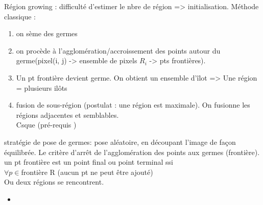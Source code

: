 \documentclass[11pt]{article}
\begin{document}
Région growing : difficulté d'estimer le nbre de région => initialisation. Méthode classique : 
\begin{enumerate}
	\item on sème des germes
	\item on procède à l'agglomération/accroissement des points autour du germe(pixel(i, j) -> ensemble de pixels $R_i$ -> pts frontières). 
	\item Un pt frontière devient germe. On obtient un ensemble d'îlot => Une région = plusieurs ilôts
	\item fusion de sous-région (postulat : une région est maximale). On fusionne les régions adjacentes et semblables.\\
		Csque (pré-requis )
\end{enumerate}

stratégie de pose de germes: pose aléatoire, en découpant l'image de façon équilibrée.
Le critère d'arrêt de l'agglomération des points aux germes (frontière).\\
un pt frontière est un point final ou point terminal ssi\\
$\forall p \in $frontière R (aucun pt ne peut être ajouté)\\
Ou deux régions se rencontrent.

\vskip 1cm 


\begin{itemize}
	\item
\end{itemize}
\end{document}
